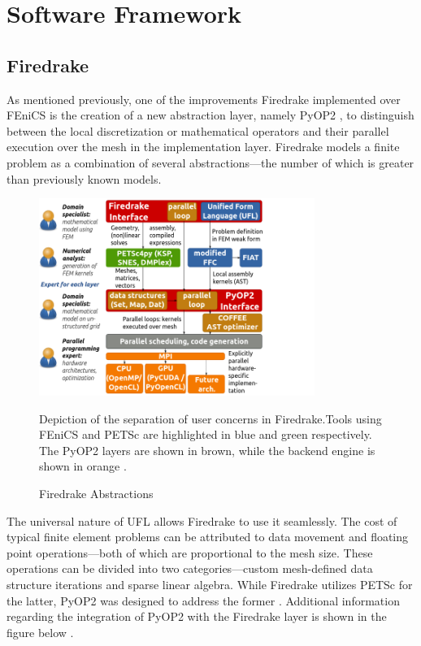 \chapter{Software Framework}
\label{chapter: software}

\section{Firedrake}
As mentioned previously, one of the improvements Firedrake \cite{rathgeber2016firedrake} implemented over FEniCS \cite{alnaes2015fenics} is the creation of a new abstraction layer, namely PyOP2 \cite{rathgeber2012pyop2}, to distinguish between the local discretization or mathematical operators and their parallel execution over the mesh in the implementation layer. Firedrake models a finite problem as a combination of several abstractions---the number of which is greater than previously known models.
 \begin{figure}[th]
        \centering
        \includegraphics[width=0.8\textwidth]{figures/firedrake_toolchain_users.png}
        \caption{Firedrake Abstractions}Depiction of the separation of user concerns in Firedrake.Tools using FEniCS and PETSc are highlighted in blue and green respectively. The PyOP2 layers are shown in brown, while the backend engine is shown in orange \cite{rathgeber2016firedrake}.
        \label{figure:parameter}
        \end{figure}
The universal nature of UFL \cite{alnaes2014unified} allows Firedrake to use it seamlessly. The cost of typical finite element problems can be attributed to data movement and floating point operations---both of which are proportional to the mesh size. These operations can be divided into two categories---custom mesh-defined data structure iterations and sparse linear algebra. While Firedrake utilizes PETSc \cite{balay2001petsc} for the latter, PyOP2 was designed to address the former \cite{rathgeber2012pyop2}. Additional information regarding the integration of PyOP2 with the Firedrake layer is shown in the figure below \cite{rathgeber2016firedrake}.
